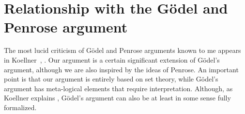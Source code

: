 \documentclass{amsart}  %
\numberwithin{equation}{section}
\newtheorem{theorem}[equation]{Theorem}
\theoremstyle{definition}
\theoremstyle{remark}
\begin{document}
{%
%
%
%

\section{Relationship with the G\"odel and Penrose argument} \label{section:Penrose}
The most lucid criticism of G\"odel and Penrose arguments known to me appears in Koellner~\cite{citeKoellner2018-KOEOTQ-3}, \cite{citeKoellnerII2018-KOEOTQ-4}. Our argument is a certain significant extension of G\"odel's argument, although we are also inspired by the ideas of Penrose. An important point is that our argument is entirely based on set theory, while G\"odel's argument has meta-logical elements that require interpretation. Although,  as Koellner explains \cite{citeKoellnerII2018-KOEOTQ-4}, G\"odel's argument can also be at least in some sense fully formalized.

}
\end{document}
